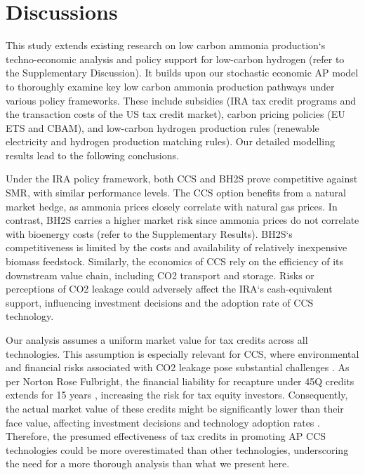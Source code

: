 \documentclass{article}
\begin{document}
\section*{Discussions}

This study extends existing research on low carbon ammonia production‘s techno-economic analysis and policy support for low-carbon hydrogen (refer to the Supplementary Discussion). It builds upon our stochastic economic AP model to thoroughly examine key low carbon ammonia production pathways under various policy frameworks. These include subsidies (IRA tax credit programs and the transaction costs of the US tax credit market), carbon pricing policies (EU ETS and CBAM), and low-carbon hydrogen production rules (renewable electricity and hydrogen production matching rules). Our detailed modelling results lead to the following conclusions. 

Under the IRA policy framework, both CCS and BH2S prove competitive against SMR, with similar performance levels. The CCS option benefits from a natural market hedge, as ammonia prices closely correlate with natural gas prices. In contrast, BH2S carries a higher market risk since ammonia prices do not correlate with bioenergy costs (refer to the Supplementary Results). BH2S‘s competitiveness is limited by the costs and availability of relatively inexpensive biomass feedstock. Similarly, the economics of CCS rely on the efficiency of its downstream value chain, including CO2 transport and storage. Risks or perceptions of CO2 leakage could adversely affect the IRA‘s cash-equivalent support, influencing investment decisions and the adoption rate of CCS technology.

Our analysis assumes a uniform market value for tax credits across all technologies. This assumption is especially relevant for CCS, where environmental and financial risks associated with CO2 leakage pose substantial challenges \cite{Herzog2011, Bartlett2019}. As per Norton Rose Fulbright, the financial liability for recapture under 45Q credits extends for 15 years \cite{Burton2023}, increasing the risk for tax equity investors. Consequently, the actual market value of these credits might be significantly lower than their face value, affecting investment decisions and technology adoption rates \cite{ALELIO2022}. Therefore, the presumed effectiveness of tax credits in promoting AP CCS technologies could be more overestimated than other technologies, underscoring the need for a more thorough analysis than what we present here.
\end{document}
